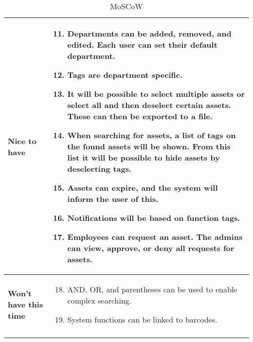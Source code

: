 \begin{longtable}{p{3.2cm} p{10cm}}
        \textbf{Nice to have} &     
        \vspace*{-7mm}
        \begin{enumerate} \setcounter{enumi}{10} \itemsep0em 
            \item Departments can be added, removed, and edited. Each user can set their default department.
            
            \item Tags are department specific.
            
            \item It will be possible to select multiple assets or select all and then deselect certain assets. These can then be exported to a file.
            
            \item When searching for assets, a list of tags on the found assets will be shown. From this list it will be possible to hide assets by deselecting tags.
            
            \item Assets can expire, and the system will inform the user of this.
            
            \item Notifications will be based on function tags.
            
            \item Employees can request an asset. The admins can view, approve, or deny all requests for assets.
            
        \end{enumerate}
        \\
        \hline
        \textbf{Won't have this time} & 
        \vspace*{-7mm}
        \begin{enumerate} \setcounter{enumi}{17} \itemsep0em 
            \item AND, OR, and parentheses can be used to enable complex searching.
            \item System functions can be linked to barcodes.
        \end{enumerate}
        \\
        \hline
    \caption{MoSCoW}
    \label{tab:moscow}
   
\end{longtable}